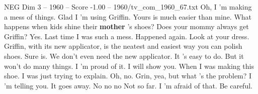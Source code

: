 \begin{textsample}{NEG Dim 3 – 1960 – Score -1.00 – 1960/tv\_com\_1960\_67.txt}  \label{ex:f3_neg_076}
Oh, I 'm making a mess of things.
Glad I 'm using Griffin.
Yours is much easier than mine.
What happens when kids shine their \textbf{mother} 's shoes?
Does your mommy always get Griffin?
Yes.
Last time I was such a mess.
Happened again.
Look at your dress.
Griffin, with its new applicator, is the neatest and easiest way you can polish shoes.
Sure is.
We don't even need the new applicator.
It 's easy to do.
But it won't do many things.
I 'm proud of it.
I will show you.
When I was making this shoe.
I was just trying to explain.
Oh, no.
Grin, yea, but what 's the problem?
I 'm telling you.
It goes away.
No no no Not so far.
I 'm afraid of that.
Be careful.

\end{textsample}
